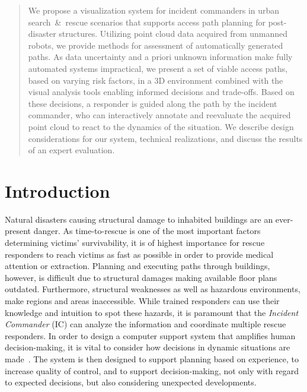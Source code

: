 \documentclass{egpubl}
\begin{document}
\maketitle

\begin{abstract}
We propose a visualization system for incident commanders in urban search~\&~rescue scenarios that supports access path planning for post-disaster structures. Utilizing point cloud data acquired from unmanned robots, we provide methods for assessment of automatically generated paths. As data uncertainty and a priori unknown information make fully automated systems impractical, we present a set of viable access paths, based on varying risk factors, in a 3D environment combined with the visual analysis tools enabling informed decisions and trade-offs. Based on these decisions, a responder is guided along the path by the incident commander, who can interactively annotate and reevaluate the acquired point cloud to react to the dynamics of the situation. We describe design considerations for our system, technical realizations, and discuss the results of an expert evaluation.

\begin{classification}
\end{classification}


\end{abstract}

\section{Introduction}

Natural disasters causing structural damage to inhabited buildings are an ever-present danger. As time-to-rescue is one of the most important factors determining victims' survivability, it is of highest importance for rescue responders to reach victims as fast as possible in order to provide medical attention or extraction. Planning and executing paths through buildings, however, is difficult due to structural damages making available floor plans outdated. Furthermore, structural weaknesses as well as hazardous environments, make regions and areas inaccessible. While trained responders can use their knowledge and intuition to spot these hazards, it is paramount that the \emph{Incident Commander} (IC) can analyze the information and coordinate multiple rescue responders. In order to design a computer support system that amplifies human decision-making, it is vital to consider how decisions in dynamic situations are made~\cite{Lundberg2012}. The system is then designed to support planning based on experience, to increase quality of control, and to support decision-making, not only with regard to expected decisions, but also considering unexpected developments.
\end{document}
